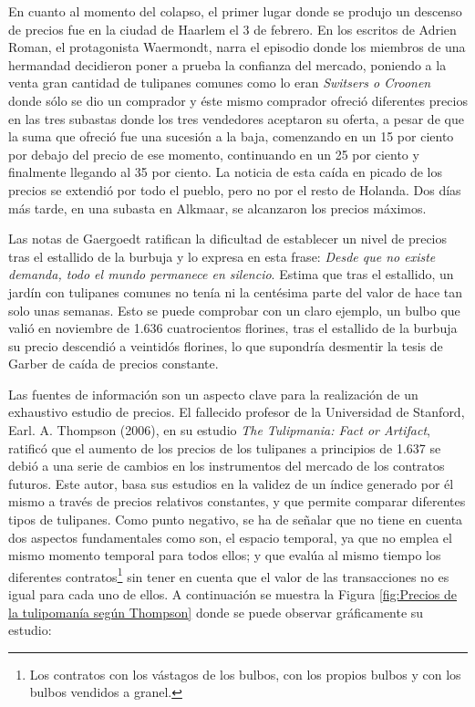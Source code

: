 En cuanto al momento del colapso, el primer lugar donde se produjo un descenso de precios fue en la ciudad de Haarlem el 3 de febrero. En los escritos de Adrien Roman, el protagonista Waermondt, narra el episodio donde los miembros de una hermandad decidieron poner a prueba la confianza del mercado, poniendo a la venta gran cantidad de tulipanes comunes como lo eran \emph{Switsers o Croonen} donde sólo se dio un comprador y éste mismo comprador ofreció diferentes precios en las tres subastas donde los tres vendedores aceptaron su oferta, a pesar de que la suma que ofreció fue una sucesión a la baja, comenzando en un 15 por ciento por debajo del precio de ese momento, continuando en un 25 por ciento y finalmente llegando al 35 por ciento. La noticia de esta caída en picado de los precios se extendió por todo el pueblo, pero no por el resto de Holanda. Dos días más tarde, en una subasta en Alkmaar, se alcanzaron los precios máximos.

Las notas de Gaergoedt ratifican la dificultad de establecer un nivel de precios tras el estallido de la burbuja y lo expresa en esta frase: \emph{Desde que no existe demanda, todo el mundo permanece en silencio}. Estima que tras el estallido, un jardín con tulipanes comunes no tenía ni la centésima parte del valor de hace tan solo unas semanas. Esto se puede comprobar con un claro ejemplo, un bulbo que valió en noviembre de 1.636 cuatrocientos florines, tras el estallido de la burbuja su precio descendió a veintidós florines, lo que supondría desmentir la tesis de Garber de caída de precios constante. 

Las fuentes de información son un aspecto clave para la realización de un exhaustivo estudio de precios. El fallecido profesor de la Universidad de Stanford, Earl. A. Thompson (2006), en su estudio \emph{The Tulipmania: Fact or Artifact}, ratificó que el aumento de los precios de los tulipanes a principios de 1.637 se debió a una serie de cambios en los instrumentos del mercado de los contratos futuros. Este autor, basa sus estudios en la validez de un índice generado por él mismo a través de precios relativos constantes, y que permite comparar diferentes tipos de tulipanes. Como punto negativo, se ha de señalar que no tiene en cuenta dos aspectos fundamentales como son, el espacio temporal, ya que no emplea el mismo momento temporal para todos ellos; y que evalúa al mismo tiempo los diferentes contratos\footnote{Los contratos con los vástagos de los bulbos, con los propios bulbos y con los bulbos vendidos a granel.} sin tener en cuenta que el valor de las transacciones no es igual para cada uno de ellos. A continuación se muestra la Figura \ref{fig:Precios de la tulipomanía según Thompson} donde se puede observar gráficamente su estudio:


